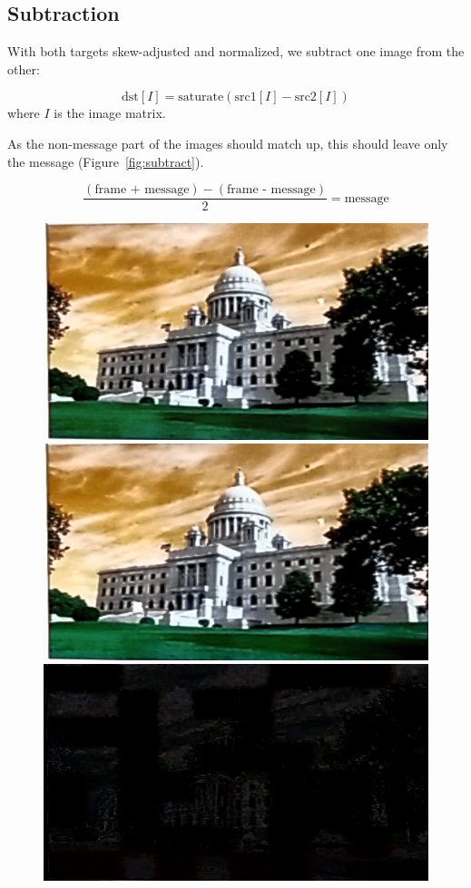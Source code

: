 \documentclass[11pt, letterpaper]{article}
\begin{document}
\subsection{Subtraction}
With both targets skew-adjusted and normalized, we subtract one image from the other:

$$\text{dst}[I] = \text{saturate}(\text{src1}[I] - \text{src2}[I])$$ where $I$ is the image matrix\cite{opencv_subtraction}.

As the non-message part of the images should match up, this should leave only the message (Figure~\ref{fig:subtract}).

$$\frac{(\text{frame + message}) - (\text{frame - message})}{2} = \text{message}$$

\begin{figure}[hbtp]
\centering
\includegraphics[scale=0.2]{img/subtract1.png}
\includegraphics[scale=0.2]{img/subtract2.png}
\\
\includegraphics[scale=0.2]{img/subtract3.png}

\end{figure}
\end{document}
